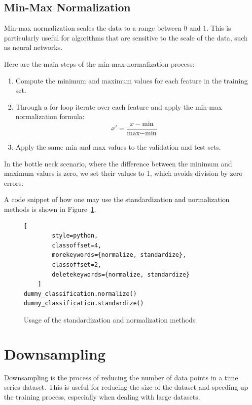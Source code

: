 \documentclass[review]{AIM_report}
\begin{document}
\subsection{Min-Max Normalization}
Min-max normalization scales the data to a range between 0 and 1. This is particularly useful for algorithms that are sensitive to the scale of the data, such as neural networks.

Here are the main steps of the min-max normalization process:
\begin{enumerate}
    \item Compute the minimum and maximum values for each feature in the training set.
    \item Through a for loop iterate over each feature and apply the min-max normalization formula:
    \begin{equation}
        x' = \frac{x - \text{min}}{\text{max} - \text{min}}
    \end{equation}
    \item Apply the same min and max values to the validation and test sets.
\end{enumerate}

In the bottle neck scenario, where the difference between the minimum and maximum values is zero, we set their values to 1, which avoids division by zero errors.

A code snippet of how one may use the standardization and normalization methods is shown in Figure~\ref{fig:usage_standardization_normalization}.
\begin{figure}[H]
    \begin{lstlisting}[
        style=python, 
        classoffset=4, 
        morekeywords={normalize, standardize}, 
        classoffset=2, 
        deletekeywords={normalize, standardize}
    ]
dummy_classification.normalize()
dummy_classification.standardize()
    \end{lstlisting}
    \caption{Usage of the standardization and normalization methods}
    \label{fig:usage_standardization_normalization}
\end{figure}

\newpage
\section{Downsampling}
Downsampling is the process of reducing the number of data points in a time series dataset. This is useful for reducing the size of the dataset and speeding up the training process, especially when dealing with large datasets.
\end{document}
